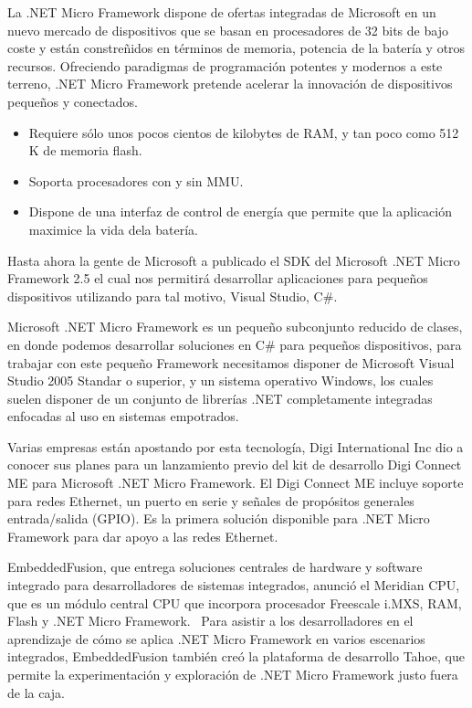 La .NET Micro Framework dispone de ofertas integradas de Microsoft en un nuevo mercado de dispositivos que se basan en procesadores de 32 bits de bajo coste y están constreñidos en términos de memoria, potencia de la batería y otros recursos. Ofreciendo paradigmas de programación potentes y modernos a este terreno, .NET Micro Framework pretende acelerar la innovación de dispositivos pequeños y conectados.

\begin{itemize}
\item Requiere sólo unos pocos cientos de kilobytes de RAM, y tan poco como 512 K de memoria flash.
\item Soporta procesadores con y sin MMU.
\item Dispone de una interfaz de control de energía que permite que la aplicación maximice la vida dela batería.
\end{itemize}


Hasta ahora la gente de Microsoft a publicado el SDK del Microsoft .NET Micro Framework 2.5 el cual nos permitirá desarrollar aplicaciones para pequeños dispositivos utilizando para tal motivo, Visual Studio, C\#. 



Microsoft .NET Micro Framework es un pequeño subconjunto reducido de clases, en donde podemos desarrollar soluciones en C\# para pequeños dispositivos, para trabajar con este pequeño Framework necesitamos disponer de Microsoft Visual Studio 2005 Standar o superior, y un sistema operativo Windows, los cuales suelen disponer de un conjunto de librerías .NET completamente integradas enfocadas al uso en sistemas empotrados.



Varias empresas están apostando por esta tecnología, Digi International Inc dio a conocer sus planes para un lanzamiento previo del kit de desarrollo Digi Connect ME para Microsoft .NET Micro Framework. El Digi Connect ME incluye soporte para redes Ethernet, un puerto en serie y señales de propósitos generales entrada/salida (GPIO). Es la primera solución disponible para .NET Micro Framework para dar apoyo a las redes Ethernet.



EmbeddedFusion, que entrega soluciones centrales de hardware y software integrado para desarrolladores de sistemas integrados, anunció el Meridian CPU, que es un módulo central CPU que incorpora procesador Freescale i.MXS, RAM, Flash y .NET Micro Framework. \ Para asistir a los desarrolladores en el aprendizaje de cómo se aplica .NET Micro Framework en varios escenarios integrados, EmbeddedFusion también creó la plataforma de desarrollo Tahoe, que permite la experimentación y exploración de .NET Micro Framework justo fuera de la caja.



